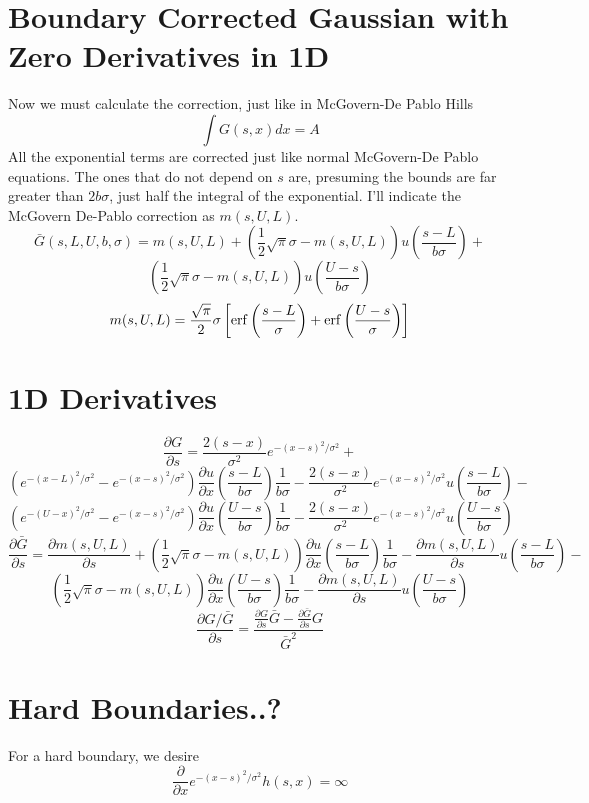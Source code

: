 \documentclass{article}
\newcommand{\erf}{\mathop{\rm erf}\nolimits}
\begin{document}
\section{Boundary Corrected Gaussian with Zero Derivatives in 1D}
Now we must calculate the correction, just like in McGovern-De Pablo
Hills
\[
\int G(s,x) dx = A
\]
All the exponential terms are corrected just like normal McGovern-De
Pablo equations. The ones that do not depend on $s$ are, presuming the
bounds are far greater than $2b\sigma$, just half the integral of the
exponential. I'll indicate the McGovern De-Pablo correction as
$m(s,U,L)$.
\[
\bar{G}(s,L,U,b,\sigma) = m(s,U,L) + \left(\frac{1}{2}\sqrt{\pi}\sigma - m(s,U,L)\right)u\left(\frac{s-L}{b\sigma}\right) + 
\]
\begin{equation}
\left(\frac{1}{2}\sqrt{\pi}\sigma - m(s,U,L)\right)u\left(\frac{U-s}{b\sigma}\right)
\end{equation}
\begin{equation}
m(s,U,L) = \frac{\sqrt{\pi}}{2} \sigma \left[\erf\left(\frac{s - L}{\sigma}\right) + \erf\left(\frac{U - s}{\sigma}\right)\right]
\end{equation}

\section{1D Derivatives}
\[
\frac{\partial G}{\partial s} = \frac{2(s - x)}{\sigma^2} e^{-(x - s)^2 / \sigma^2} + 
\]
\[
\left(e^{-(x-L)^2/\sigma^2} - e^{-(x - s)^2 / \sigma^2}\right)\frac{\partial u}{\partial x}\left(\frac{s-L}{b\sigma}\right)\frac{1}{b\sigma} - \frac{2(s - x)}{\sigma^2} e^{-(x - s)^2 / \sigma^2} u\left(\frac{s-L}{b\sigma}\right) -
\]
\[
\left(e^{-(U-x)^2/\sigma^2} - e^{-(x - s)^2 / \sigma^2}\right)\frac{\partial u}{\partial x}\left(\frac{U-s}{b\sigma}\right)\frac{1}{b\sigma} - \frac{2(s - x)}{\sigma^2} e^{-(x - s)^2 / \sigma^2} u\left(\frac{U-s}{b\sigma}\right)
\]
\[
\frac{\partial \bar{G}}{\partial s} = \frac{\partial m(s, U, L)}{\partial s} + \left(\frac{1}{2}\sqrt{\pi}\sigma - m(s,U,L)\right)\frac{\partial u}{\partial x}\left(\frac{s-L}{b\sigma}\right)\frac{1}{b\sigma} - \frac{\partial m(s, U, L)}{\partial s}u\left(\frac{s-L}{b\sigma}\right) -
\]
\[
\left(\frac{1}{2}\sqrt{\pi}\sigma - m(s,U,L)\right)\frac{\partial u}{\partial x}\left(\frac{U-s}{b\sigma}\right)\frac{1}{b\sigma} - \frac{\partial m(s, U, L)}{\partial s}u\left(\frac{U-s}{b\sigma}\right)
\]
\[
\frac{\partial G/\bar{G}}{\partial s} = \frac{\frac{\partial G}{\partial s}\bar{G} - \frac{\partial \bar{G}}{\partial s}G}{\bar{G}^2}
\]

\section{Hard Boundaries..?}
For a hard boundary, we desire 
\[
\frac{\partial}{\partial x} e^{-(x - s)^2 / \sigma^2} h(s,x) = \infty
\]
\end{document}
